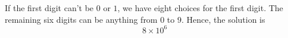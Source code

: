 If the first digit can't be $0$ or $1$, we have eight choices for the first digit. The remaining six digits can be anything from $0$ to $9$. Hence, the solution is
  $$ 8 \times 10^{6}$$